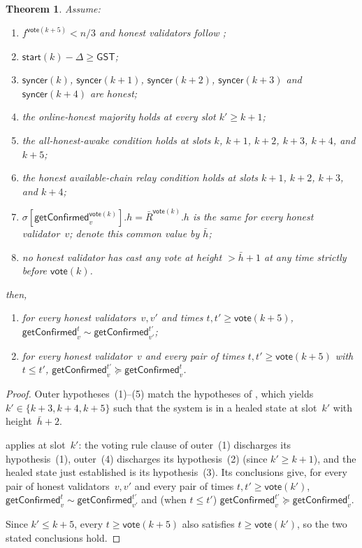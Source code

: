 \ifx\litemode\undefined\documentclass{article}\fi
\newcommand{\syncer}{\mathsf{syncer}}
\newcommand{\start}{\mathsf{start}}
\newcommand{\vote}{\mathsf{vote}}
\newcommand{\comm}[1]{\bar{#1}}
\newcommand{\getConfirmed}{\textsf{getConfirmed}\xspace}
\theoremstyle{plain}
\newtheorem{theorem}{Theorem}
\theoremstyle{definition}
\theoremstyle{remark}
\newcommand{\GST}{\ensuremath{\mathsf{GST}}}
\newcommand{\OHM}{online-honest majority\xspace}
\newcommand{\HAR}{honest available-chain relay\xspace}
\newcommand{\AHA}{all-honest-awake\xspace}
\begin{document}
\begin{theorem}
Assume:
\begin{enumerate}
  \item $f^{\vote(k+5)} < n/3$ and honest validators follow ;
  \item $\start(k) - \Delta \geq \GST$;
  \item $\syncer(k)$, $\syncer(k+1)$, $\syncer(k+2)$, $\syncer(k+3)$ and $\syncer(k+4)$ are honest;
  \item the \OHM holds at every slot $k' \geq k+1$;
  \item the \AHA condition holds at slots $k$, $k+1$, $k+2$, $k+3$, $k+4$, and $k+5$;
  \item the \HAR condition holds at slots $k+1$, $k+2$, $k+3$, and $k+4$;
  \item $\sigma[\getConfirmed_v^{\vote(k)}].h = \comm{R}^{\vote(k)}.h$ is the same for every honest validator~$v$; denote this common value by $\comm{h}$;
  \item no honest validator has cast any vote at height $> \comm{h}+1$ at any time strictly before $\vote(k)$.
\end{enumerate}
then,
\begin{enumerate}
  \item for every honest validators~$v,v'$ and times $t, t' \geq \vote(k+5)$, $\getConfirmed_v^{t} \sim \getConfirmed_{v'}^{t'}$;
  \item for every honest validator~$v$ and every pair of times $t, t' \geq \vote(k+5)$ with $t \leq t'$, $\getConfirmed_v^{t'} \succeq \getConfirmed_v^t$.
\end{enumerate}
\end{theorem}

\begin{proof}
Outer hypotheses~(1)--(5) match the hypotheses of , which yields $k' \in \{k+3, k+4, k+5\}$ such that the system is in a healed state at slot~$k'$ with height~$\comm{h}+2$.

 applies at slot~$k'$: the voting rule clause of outer~(1) discharges its hypothesis~(1), outer~(4) discharges its hypothesis~(2) (since $k' \geq k+1$), and the healed state just established is its hypothesis~(3). Its conclusions give, for every pair of honest validators~$v, v'$ and every pair of times $t, t' \geq \vote(k')$, $\getConfirmed_v^t \sim \getConfirmed_{v'}^{t'}$ and (when $t \leq t'$) $\getConfirmed_v^{t'} \succeq \getConfirmed_v^t$.

Since $k' \leq k+5$, every $t \geq \vote(k+5)$ also satisfies $t \geq \vote(k')$, so the two stated conclusions hold.
\end{proof}
\end{document}
